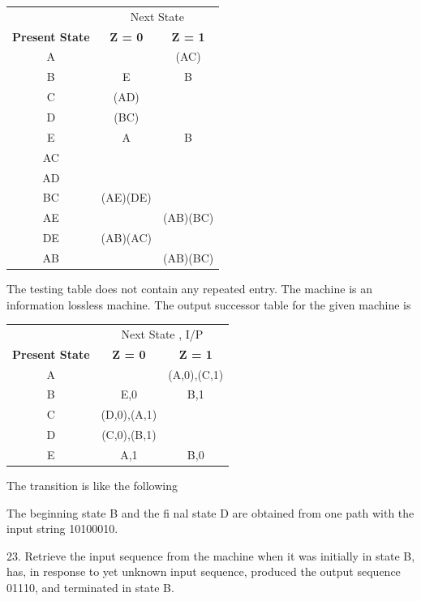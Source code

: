 \documentclass{beamer}
\begin{document}
\begin{frame}
	\begin{center}
		\begin{tabular}{ccc}
			\hline
			& \multicolumn{2}{c}{Next State}\\
			\cline{2-3}
			\textbf{Present State} & \textbf{Z = 0} & \textbf{Z = 1}\\
			\hline
			A & & (AC)\\
			B & E & B\\
			C & (AD)\\
			D &(BC)\\
			E & A & B\\
			\hline
			AC\\
			AD\\
			BC & (AE)(DE)\\
			AE & & (AB)(BC)\\
			DE & (AB)(AC)\\
			AB & & (AB)(BC)\\
			\hline
		\end{tabular}
	\end{center}
	
	The testing table does not contain any repeated entry. The machine is an information lossless machine. The output successor table for the given machine is
	
\end{frame}

\begin{frame}
	\begin{center}
		\begin{tabular}{ccc}
			\hline
			& \multicolumn{2}{c}{Next State , I/P}\\
			\cline{2-3}
			\textbf{Present State} & \textbf{Z = 0} & \textbf{Z = 1}\\
			\hline
			A & & (A,0),(C,1)\\
			B & E,0 & B,1\\
			C & (D,0),(A,1)\\
			D & (C,0),(B,1)\\
			E & A,1 & B,0\\
			\hline
		\end{tabular}
	\end{center}
	
	The transition is like the following
	
	The beginning state B and the ﬁ nal state D are obtained from one path with the input string 10100010.
	
	23. Retrieve the input sequence from the machine when it was initially in state B, has, in response to yet unknown input sequence, produced the output sequence 01110, and terminated in state B.
\end{frame}
\end{document}
